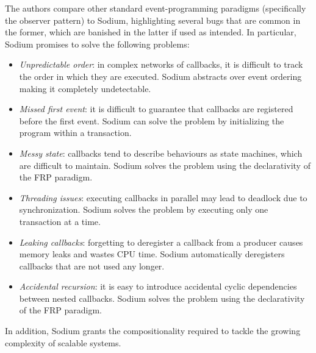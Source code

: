 The authors compare other standard event-programming paradigms (specifically
the observer pattern) to Sodium, highlighting several bugs that are common in
the former, which are banished in the latter if used as intended. In
particular, Sodium promises to solve the following problems:
\begin{itemize}
  \item \textit{Unpredictable order}: in complex networks of callbacks, it is
        difficult to track the order in which they are executed. Sodium
        abstracts over event ordering making it completely undetectable.
  \item \textit{Missed first event}: it is difficult to guarantee that
        callbacks are registered before the first event. Sodium can solve the
        problem by initializing the program within a transaction.
  \item \textit{Messy state}: callbacks tend to describe behaviours as state
        machines, which are difficult to maintain. Sodium solves the problem
        using the declarativity of the \ac{FRP} paradigm.
  \item \textit{Threading issues}: executing callbacks in parallel may lead to
        deadlock due to synchronization. Sodium solves the problem by executing
        only one transaction at a time.
  \item \textit{Leaking callbacks}: forgetting to deregister a callback from
        a producer causes memory leaks and wastes CPU time. Sodium
        automatically deregisters callbacks that are not used any longer.
  \item \textit{Accidental recursion}: it is easy to introduce accidental
        cyclic dependencies between nested callbacks. Sodium solves the problem
        using the declarativity of the \ac{FRP} paradigm.
\end{itemize}
In addition, Sodium grants the compositionality required to tackle the growing
complexity of scalable systems.
